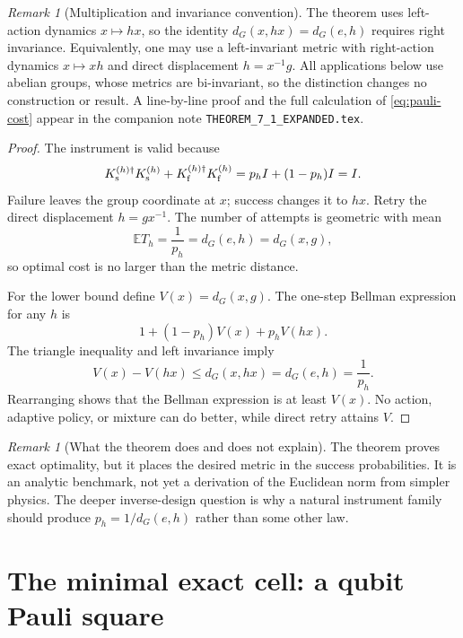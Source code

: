 \documentclass[11pt]{article}
\theoremstyle{definition}
\theoremstyle{remark}
\newtheorem{remark}[theorem]{Remark}
\newcommand{\E}{\mathbb E}
\begin{document}
\begin{remark}[Multiplication and invariance convention]
The theorem uses left-action dynamics $x\mapsto hx$, so the identity
$d_G(x,hx)=d_G(e,h)$ requires right invariance. Equivalently, one may use a
left-invariant metric with right-action dynamics $x\mapsto xh$ and direct
displacement $h=x^{-1}g$. All applications below use abelian groups, whose
metrics are bi-invariant, so the distinction changes no construction or
result. A line-by-line proof and the full calculation of
\cref{eq:pauli-cost} appear in the companion note
\texttt{THEOREM\_7\_1\_EXPANDED.tex}.
\end{remark}

\begin{proof}
The instrument is valid because
\begin{equation}
 K_{\rm s}^{(h)\dagger}K_{\rm s}^{(h)}
 +K_{\rm f}^{(h)\dagger}K_{\rm f}^{(h)}
 =p_hI+(1-p_h)I=I.
\end{equation}
Failure leaves the group coordinate at $x$; success changes it to $hx$.
Retry the direct displacement $h=gx^{-1}$. The number of attempts is geometric
with mean
\begin{equation}
 \E T_h=\frac1{p_h}=d_G(e,h)=d_G(x,g),
\end{equation}
so optimal cost is no larger than the metric distance.

For the lower bound define $V(x)=d_G(x,g)$. The one-step Bellman expression
for any $h$ is
\begin{equation}
 1+(1-p_h)V(x)+p_hV(hx).
\end{equation}
The triangle inequality and left invariance imply
\begin{equation}
 V(x)-V(hx)\le d_G(x,hx)=d_G(e,h)=\frac1{p_h}.
\end{equation}
Rearranging shows that the Bellman expression is at least $V(x)$. No action,
adaptive policy, or mixture can do better, while direct retry attains $V$.
\end{proof}

\begin{remark}[What the theorem does and does not explain]
The theorem proves exact optimality, but it places the desired metric in the
success probabilities. It is an analytic benchmark, not yet a derivation of
the Euclidean norm from simpler physics. The deeper inverse-design question is
why a natural instrument family should produce
$p_h=1/d_G(e,h)$ rather than some other law.
\end{remark}
\section{The minimal exact cell: a qubit Pauli square}
\label{sec:pauli}
\end{document}
